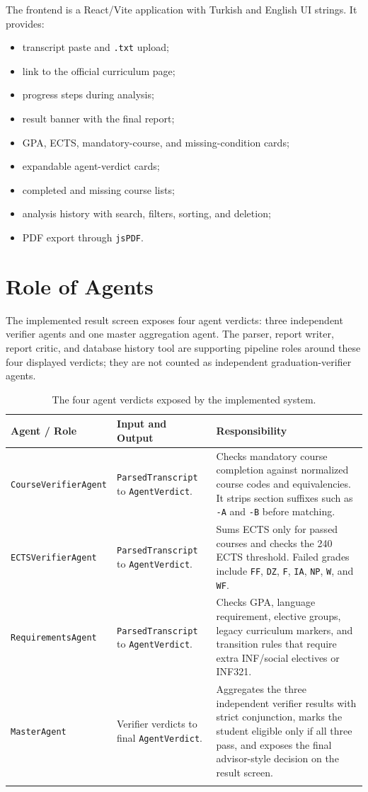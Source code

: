 \documentclass[11pt,a4paper]{article}
\begin{document}
The frontend is a React/Vite application with Turkish and English UI strings.
It provides:

\begin{itemize}
  \item transcript paste and \texttt{.txt} upload;
  \item link to the official curriculum page;
  \item progress steps during analysis;
  \item result banner with the final report;
  \item GPA, ECTS, mandatory-course, and missing-condition cards;
  \item expandable agent-verdict cards;
  \item completed and missing course lists;
  \item analysis history with search, filters, sorting, and deletion;
  \item PDF export through \texttt{jsPDF}.
\end{itemize}

\section{Role of Agents}

The implemented result screen exposes four agent verdicts: three independent
verifier agents and one master aggregation agent. The parser, report writer,
report critic, and database history tool are supporting pipeline roles around
these four displayed verdicts; they are not counted as independent
graduation-verifier agents.

\begin{longtable}{p{}p{}p{}}
\toprule
\textbf{Agent / Role} & \textbf{Input and Output} & \textbf{Responsibility} \\
\midrule
\endhead
\texttt{CourseVerifierAgent} &
\texttt{ParsedTranscript} to \texttt{AgentVerdict}. &
Checks mandatory course completion against normalized course codes and
equivalencies. It strips section suffixes such as \texttt{-A} and \texttt{-B}
before matching. \\
\midrule
\texttt{ECTSVerifierAgent} &
\texttt{ParsedTranscript} to \texttt{AgentVerdict}. &
Sums ECTS only for passed courses and checks the 240 ECTS threshold. Failed
grades include \texttt{FF}, \texttt{DZ}, \texttt{F}, \texttt{IA},
\texttt{NP}, \texttt{W}, and \texttt{WF}. \\
\midrule
\texttt{RequirementsAgent} &
\texttt{ParsedTranscript} to \texttt{AgentVerdict}. &
Checks GPA, language requirement, elective groups, legacy curriculum markers,
and transition rules that require extra INF/social electives or INF321. \\
\midrule
\texttt{MasterAgent} &
Verifier verdicts to final \texttt{AgentVerdict}. &
Aggregates the three independent verifier results with strict conjunction,
marks the student eligible only if all three pass, and exposes the final
advisor-style decision on the result screen. \\
\bottomrule
\caption{The four agent verdicts exposed by the implemented system.}
\end{longtable}
\end{document}

